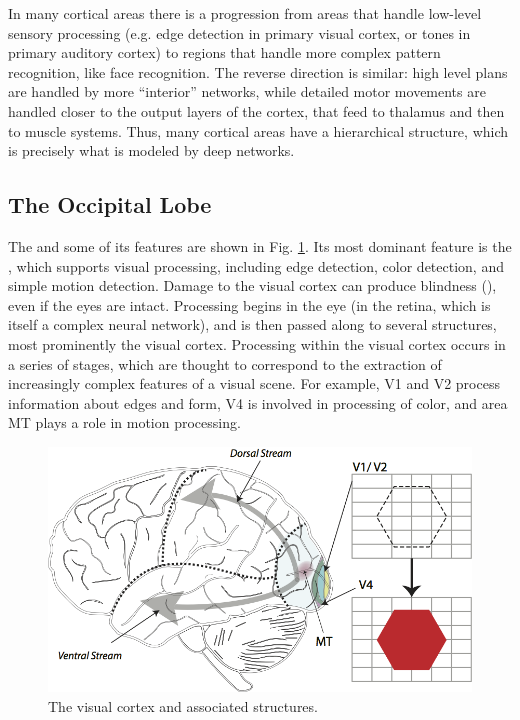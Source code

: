 In many cortical areas there is a progression from areas that handle low-level sensory processing (e.g. edge detection in primary visual cortex, or tones in primary auditory cortex) to regions that handle more complex pattern recognition, like face recognition. The reverse direction is similar: high level plans are handled by more ``interior'' networks, while detailed motor movements are handled closer to the output layers of the cortex, that feed to thalamus and then to muscle systems. Thus, many cortical areas have a hierarchical structure, which is precisely what is modeled by deep networks. 

\subsection{The Occipital Lobe}

The  and some of its features are shown in Fig. \ref{brain_vision}. Its most dominant feature is the , which supports visual processing, including edge detection, color detection, and simple motion detection. Damage to the visual cortex can produce blindness (), even if the eyes are intact. Processing begins in the eye (in the retina, which is itself a complex neural network), and is then passed along to several structures, most prominently the visual cortex. Processing within the visual cortex occurs in a series of stages, which are thought to correspond to the extraction of increasingly complex features of a visual scene. For example, V1 and  V2  process information about edges and form, V4 is involved in processing of color, and area MT plays a role in motion processing. 

\begin{figure}[h]
\centering
\includegraphics[scale=.6]{./images/brain_vision.png}
\caption[Pamela Payne.]{The visual cortex and associated structures.}
\label{brain_vision}
\end{figure}

